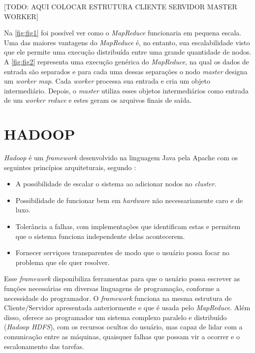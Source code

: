 [TODO: AQUI COLOCAR ESTRUTURA CLIENTE SERVIDOR MASTER WORKER]

Na \autoref{fig:fig1} foi possível ver como o \textit{MapReduce} funcionaria em pequena escala. Uma das maiores vantagens do \textit{MapReduce} é, no entanto, sua escalabilidade visto que ele permite uma execução distribuída entre uma grande quantidade de nodos. A \autoref{fig:fig2}  representa uma execução genérica do \textit{MapReduce}, na qual os dados de entrada são separados e para cada uma dessas separações o nodo \textit{master} designa um \textit{worker map}. Cada \textit{worker} processa sua entrada e cria um objeto intermediário. Depois, o \textit{master} utiliza esses objetos intermediários como entrada de um \textit{worker reduce} e estes geram os arquivos finais de saída.


\section{HADOOP} \label{sec:hadoop}

\textit{Hadoop} é um \textit{framework} desenvolvido na linguagem Java pela Apache com os seguintes princípios arquiteturais, segundo \textcite{ImprovingNavarro18}:
\begin{itemize}
  \item A possibilidade de escalar o sistema ao adicionar nodos no \textit{cluster}.
  \item Possibilidade de funcionar bem em \textit{hardware} não necessariamente caro e de luxo.
  \item Tolerância a falhas, com implementações que identificam estas e permitem que o sistema funciona independente delas acontecerem.
  \item Fornecer serviçoes transparentes de modo que o usuário possa focar no problema que ele quer resolver.
\end{itemize}

Esse \textit{framework} disponibiliza ferramentas para que o usuário possa escrever as funções necessárias em diversas linguagens de programação, conforme a necessidade do programador. O \textit{framework} funciona na mesma estrutura de Cliente/Servidor apresentada anteriormente e que é usada pelo \textit{MapReduce}. Além disso, oferece ao programador um sistema complexo paralelo e distribuído (\textit{Hadoop HDFS}), com os recursos ocultos do usuário, mas capaz de lidar com a comunicação entre as máquinas, quaisquer falhas que possam vir a ocorrer e o escalonamento das tarefas.


